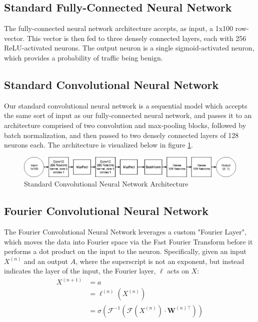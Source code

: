 \documentclass[10pt]{article}
\begin{document}
\subsection{Standard Fully-Connected Neural Network}
The fully-connected neural network architecture accepts, as input, a 1x100 row-vector. 
This vector is then fed to three densely connected layers, each with 256 ReLU-activated neurons.
The output neuron is a single sigmoid-activated neuron, which provides a probability of traffic being benign.

\subsection{Standard Convolutional Neural Network}
Our standard convolutional neural network is a sequential model which accepts the same sort of input as our fully-connected neural network, and passes it to an architecture comprised of two convolution and max-pooling blocks, followed by batch normalization, and then passed to two densely connected layers of 128 neurons each. The architecture is visualized below in figure \ref{fig:conv net}.

\begin{figure}[h]
\caption{Standard Convolutional Neural Network Architecture}
\label{fig:conv net}
\includegraphics[width=\textwidth]{conv_architecture}
\centering
\end{figure}

\subsection{Fourier Convolutional Neural Network}
The Fourier Convolutional Neural Network leverages a custom "Fourier Layer", which moves the data into Fourier space via the Fast Fourier Transform before it performs a dot product on the input to the neuron.
Specifically, given an input $X^{(n)}$ and an output $A$, where the superscript is not an exponent, but instead indicates the layer of the input, the Fourier layer, $\ell$ acts on $X$: 
\begin{align*}
X^{(n+1)} & = a \\
& = \ell^{(n)}(X^{(n)}) \\
& = \sigma(\mathcal{F}^{-1}(\mathcal{F}(X^{(n)})\cdot \mathbf{W}^{(n)\top}))
\end{align*}
\end{document}
